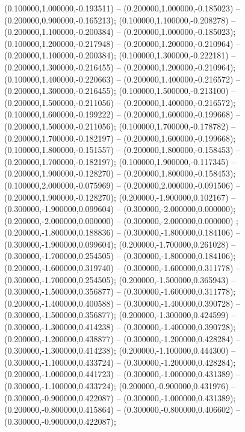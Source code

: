  (0.100000,1.000000,-0.193511) -- (0.200000,1.000000,-0.185023) -- (0.200000,0.900000,-0.165213);
 (0.100000,1.100000,-0.208278) -- (0.200000,1.100000,-0.200384) -- (0.200000,1.000000,-0.185023);
 (0.100000,1.200000,-0.217948) -- (0.200000,1.200000,-0.210964) -- (0.200000,1.100000,-0.200384);
 (0.100000,1.300000,-0.222181) -- (0.200000,1.300000,-0.216455) -- (0.200000,1.200000,-0.210964);
 (0.100000,1.400000,-0.220663) -- (0.200000,1.400000,-0.216572) -- (0.200000,1.300000,-0.216455);
 (0.100000,1.500000,-0.213100) -- (0.200000,1.500000,-0.211056) -- (0.200000,1.400000,-0.216572);
 (0.100000,1.600000,-0.199222) -- (0.200000,1.600000,-0.199668) -- (0.200000,1.500000,-0.211056);
 (0.100000,1.700000,-0.178782) -- (0.200000,1.700000,-0.182197) -- (0.200000,1.600000,-0.199668);
 (0.100000,1.800000,-0.151557) -- (0.200000,1.800000,-0.158453) -- (0.200000,1.700000,-0.182197);
 (0.100000,1.900000,-0.117345) -- (0.200000,1.900000,-0.128270) -- (0.200000,1.800000,-0.158453);
 (0.100000,2.000000,-0.075969) -- (0.200000,2.000000,-0.091506) -- (0.200000,1.900000,-0.128270);
 (0.200000,-1.900000,0.102167) -- (0.300000,-1.900000,0.099604) -- (0.300000,-2.000000,0.000000);
 (0.200000,-2.000000,0.000000) -- (0.300000,-2.000000,0.000000) ;
 (0.200000,-1.800000,0.188836) -- (0.300000,-1.800000,0.184106) -- (0.300000,-1.900000,0.099604);
 (0.200000,-1.700000,0.261028) -- (0.300000,-1.700000,0.254505) -- (0.300000,-1.800000,0.184106);
 (0.200000,-1.600000,0.319740) -- (0.300000,-1.600000,0.311778) -- (0.300000,-1.700000,0.254505);
 (0.200000,-1.500000,0.365943) -- (0.300000,-1.500000,0.356877) -- (0.300000,-1.600000,0.311778);
 (0.200000,-1.400000,0.400588) -- (0.300000,-1.400000,0.390728) -- (0.300000,-1.500000,0.356877);
 (0.200000,-1.300000,0.424599) -- (0.300000,-1.300000,0.414238) -- (0.300000,-1.400000,0.390728);
 (0.200000,-1.200000,0.438877) -- (0.300000,-1.200000,0.428284) -- (0.300000,-1.300000,0.414238);
 (0.200000,-1.100000,0.444300) -- (0.300000,-1.100000,0.433724) -- (0.300000,-1.200000,0.428284);
 (0.200000,-1.000000,0.441723) -- (0.300000,-1.000000,0.431389) -- (0.300000,-1.100000,0.433724);
 (0.200000,-0.900000,0.431976) -- (0.300000,-0.900000,0.422087) -- (0.300000,-1.000000,0.431389);
 (0.200000,-0.800000,0.415864) -- (0.300000,-0.800000,0.406602) -- (0.300000,-0.900000,0.422087);

